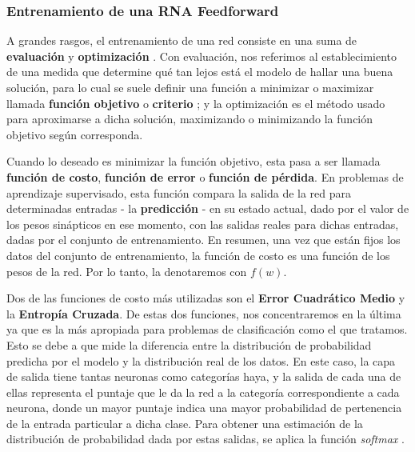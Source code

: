 \documentclass[../../main.tex]{subfiles}
\begin{document}
\subsubsection{Entrenamiento de una RNA Feedforward}
A grandes rasgos, el entrenamiento de una red consiste en una suma de \textbf{evaluación} y \textbf{optimización} \cite{pedro-domingos}. Con evaluación, nos referimos al establecimiento de una medida que determine qué tan lejos está el modelo de hallar una buena solución, para lo cual se suele definir una función a minimizar o maximizar llamada \textbf{función objetivo} o \textbf{criterio} \cite{deep-learning}; y la optimización es el método usado para aproximarse a dicha solución, maximizando o minimizando la función objetivo según corresponda.

Cuando lo deseado es minimizar la función objetivo, esta pasa a ser llamada \textbf{función de costo}, \textbf{función de error} o \textbf{función de pérdida}. En problemas de aprendizaje supervisado, esta función compara la salida de la red para determinadas entradas - la \textbf{predicción} - en su estado actual, dado por el valor de los pesos sinápticos en ese momento, con las salidas reales para dichas entradas, dadas por el conjunto de entrenamiento. En resumen, una vez que están fijos los datos del conjunto de entrenamiento, la función de costo es una función de los pesos de la red. Por lo tanto, la denotaremos con \(f(w)\).

Dos de las funciones de costo más utilizadas son el \textbf{Error Cuadrático Medio} y la \textbf{Entropía Cruzada}. De estas dos funciones, nos concentraremos en la última ya que es la más apropiada para problemas de clasificación como el que tratamos. Esto se debe a que mide la diferencia entre la distribución de probabilidad predicha por el modelo y la distribución real de los datos.  En este caso, la capa de salida tiene tantas neuronas como categorías haya, y la salida de cada una de ellas representa el puntaje que le da la red a la categoría correspondiente a cada neurona, donde un mayor puntaje indica una mayor probabilidad de pertenencia de la entrada particular a dicha clase. Para obtener una estimación de la distribución de probabilidad dada por estas salidas, se aplica la función \textit{softmax} \cite{hands-on-ML-sklearn-tf}.
\end{document}
